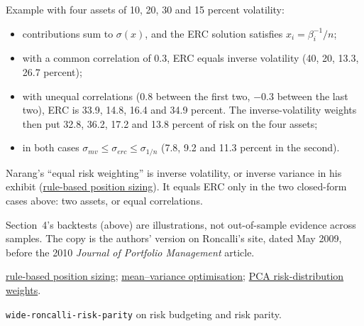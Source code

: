 \begin{qfmethod}
 Example with four assets of 10, 20, 30 and 15 percent volatility:
\begin{itemize}
\item contributions sum to $\sigma(x)$, and the ERC solution satisfies $x_i=\beta_i^{-1}/n$;
\item with a common correlation of 0.3, ERC equals inverse volatility (40, 20, 13.3, 26.7 percent);
\item with unequal correlations (0.8 between the first two, $-0.3$ between the last two), ERC is 33.9, 14.8, 16.4 and 34.9 percent. The inverse-volatility weights then put 32.8, 36.2, 17.2 and 13.8 percent of risk on the four assets;
\item in both cases $\sigma_{mv}\le\sigma_{erc}\le\sigma_{1/n}$ (7.8, 9.2 and 11.3 percent in the second).
\end{itemize}
Narang's ``equal risk weighting'' is inverse volatility, or inverse variance in his exhibit (\hyperref[meth:rule-based-position-sizing]{rule-based position sizing}). It equals ERC only in the two closed-form cases above: two assets, or equal correlations.

 Section~4's backtests (above) are illustrations, not out-of-sample evidence across samples. The copy is the authors' version on Roncalli's site, dated May 2009, before the 2010 \emph{Journal of Portfolio Management} article.

 \hyperref[meth:rule-based-position-sizing]{rule-based position sizing}; \hyperref[mod:mean-variance-portfolio-optimisation]{mean--variance optimisation}; \hyperref[mod:pca-risk-distribution-weights]{PCA risk-distribution weights}.

 \nolinkurl{wide-roncalli-risk-parity} on risk budgeting and risk parity.

\end{qfmethod}


